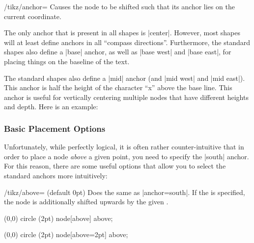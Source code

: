 \begin{key}{/tikz/anchor=}
    Causes the node to be shifted such that its anchor  lies
    on the current coordinate.

    The only anchor that is present in all shapes is |center|. However, most
    shapes will at least define anchors in all ``compass directions''.
    Furthermore, the standard shapes also define a |base| anchor, as well as
    |base west| and |base east|, for placing things on the baseline of the
    text.

    The standard shapes also define a |mid| anchor (and |mid west| and
    |mid east|). This anchor is half the height of the character ``x'' above
    the base line. This anchor is useful for vertically centering multiple
    nodes that have different heights and depth. Here is an example:
\begin{codeexample}[]
\end{codeexample}
\end{key}


\subsubsection{Basic Placement Options}

Unfortunately, while perfectly logical, it is often rather counter-intuitive
that in order to place a node \emph{above} a given point, you need to specify
the |south| anchor. For this reason, there are some useful options that allow
you to select the standard anchors more intuitively:

\begin{key}{/tikz/above= (default 0pt)}
    Does the same as |anchor=south|. If the  is specified, the
    node is additionally shifted upwards by the given .
\begin{codeexample}[]
\tikz \fill (0,0) circle (2pt) node[above] {above};
\end{codeexample}
\begin{codeexample}[]
\tikz \fill (0,0) circle (2pt) node[above=2pt] {above};
\end{codeexample}
\end{key}

